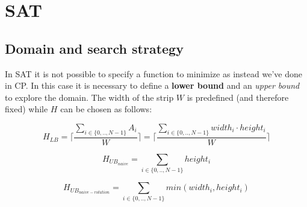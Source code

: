\chapter{SAT}

\section{Domain and search strategy}

In SAT it is not possible to specify a function to minimize as instead we've done in CP. In this case it is necessary to define a \textbf{lower bound} and an \textit{upper bound} to explore the domain. The width of the strip $W$ is predefined (and therefore fixed) while $H$ can be chosen as follows:

$$H_{LB} = \lceil \frac{\sum_{i \in \{0, .., N-1\}}{A_{i}}}{W} \rceil =\lceil \frac{\sum_{i \in \{0, .., N-1\}}{width_{i} \cdot height_{i}}}{W} \rceil$$

$$H_{{UB}_{naive}} = \sum_{i \in \{0, .., N-1\}} height_i$$

$$H_{{UB}_{naive-rotation}} = \sum_{i \in \{0, .., N-1\}}{min({width_i, height_i})}$$

